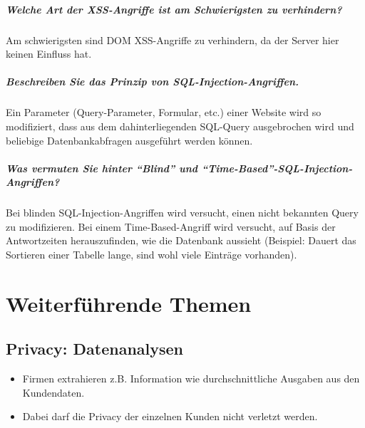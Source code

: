 		\paragraph{Welche Art der XSS-Angriffe ist am Schwierigsten zu verhindern?}
		Am schwierigsten sind DOM XSS-Angriffe zu verhindern, da der Server hier keinen Einfluss hat.
		
		\paragraph{Beschreiben Sie das Prinzip von SQL-Injection-Angriffen.}
		Ein Parameter (Query-Parameter, Formular, etc.) einer Website wird so modifiziert, dass aus dem dahinterliegenden SQL-Query ausgebrochen wird und beliebige Datenbankabfragen ausgeführt werden können.
		
		\paragraph{Was vermuten Sie hinter \enquote{Blind} und \enquote{Time-Based}-SQL-Injection-Angriffen?}
		Bei blinden SQL-Injection-Angriffen wird versucht, einen nicht bekannten Query zu modifizieren. Bei einem Time-Based-Angriff wird versucht, auf Basis der Antwortzeiten herauszufinden, wie die Datenbank aussieht (Beispiel: Dauert das Sortieren einer Tabelle lange, sind wohl viele Einträge vorhanden).

\chapter{Weiterführende Themen}
    \section{Privacy: Datenanalysen}
        \begin{itemize}
        	\item Firmen extrahieren z.B. Information wie durchschnittliche Ausgaben aus den Kundendaten.
        	\item Dabei darf die Privacy der einzelnen Kunden nicht verletzt werden.
        \end{itemize}

